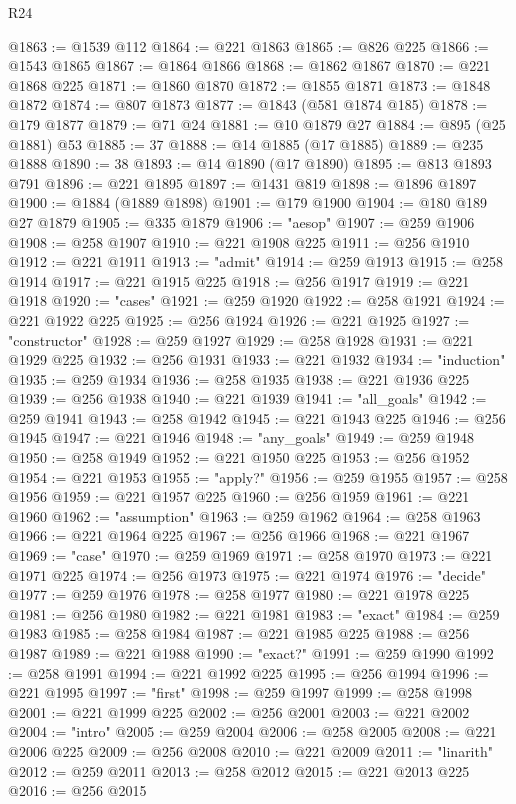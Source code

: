 \begin{lexlean}{R24}
\begin{coremodule}
@1863 := @1539 @112
@1864 := @221 @1863
@1865 := @826 @225
@1866 := @1543 @1865
@1867 := @1864 @1866
@1868 := @1862 @1867
@1870 := @221 @1868 @225
@1871 := @1860 @1870
@1872 := @1855 @1871
@1873 := @1848 @1872
@1874 := @807 @1873
@1877 := @1843 (@581 @1874 @185)
@1878 := @179 @1877
@1879 := @71 @24
@1881 := @10 @1879 @27
@1884 := @895 (@25 @1881) @53
@1885 := 37
@1888 := @14 @1885 (@17 @1885)
@1889 := @235 @1888
@1890 := 38
@1893 := @14 @1890 (@17 @1890)
@1895 := @813 @1893 @791
@1896 := @221 @1895
@1897 := @1431 @819
@1898 := @1896 @1897
@1900 := @1884 (@1889 @1898)
@1901 := @179 @1900
@1904 := @180 @189 @27 @1879
@1905 := @335 @1879
@1906 := "aesop"
@1907 := @259 @1906
@1908 := @258 @1907
@1910 := @221 @1908 @225
@1911 := @256 @1910
@1912 := @221 @1911
@1913 := "admit"
@1914 := @259 @1913
@1915 := @258 @1914
@1917 := @221 @1915 @225
@1918 := @256 @1917
@1919 := @221 @1918
@1920 := "cases"
@1921 := @259 @1920
@1922 := @258 @1921
@1924 := @221 @1922 @225
@1925 := @256 @1924
@1926 := @221 @1925
@1927 := "constructor"
@1928 := @259 @1927
@1929 := @258 @1928
@1931 := @221 @1929 @225
@1932 := @256 @1931
@1933 := @221 @1932
@1934 := "induction"
@1935 := @259 @1934
@1936 := @258 @1935
@1938 := @221 @1936 @225
@1939 := @256 @1938
@1940 := @221 @1939
@1941 := "all_goals"
@1942 := @259 @1941
@1943 := @258 @1942
@1945 := @221 @1943 @225
@1946 := @256 @1945
@1947 := @221 @1946
@1948 := "any_goals"
@1949 := @259 @1948
@1950 := @258 @1949
@1952 := @221 @1950 @225
@1953 := @256 @1952
@1954 := @221 @1953
@1955 := "apply?"
@1956 := @259 @1955
@1957 := @258 @1956
@1959 := @221 @1957 @225
@1960 := @256 @1959
@1961 := @221 @1960
@1962 := "assumption"
@1963 := @259 @1962
@1964 := @258 @1963
@1966 := @221 @1964 @225
@1967 := @256 @1966
@1968 := @221 @1967
@1969 := "case"
@1970 := @259 @1969
@1971 := @258 @1970
@1973 := @221 @1971 @225
@1974 := @256 @1973
@1975 := @221 @1974
@1976 := "decide"
@1977 := @259 @1976
@1978 := @258 @1977
@1980 := @221 @1978 @225
@1981 := @256 @1980
@1982 := @221 @1981
@1983 := "exact"
@1984 := @259 @1983
@1985 := @258 @1984
@1987 := @221 @1985 @225
@1988 := @256 @1987
@1989 := @221 @1988
@1990 := "exact?"
@1991 := @259 @1990
@1992 := @258 @1991
@1994 := @221 @1992 @225
@1995 := @256 @1994
@1996 := @221 @1995
@1997 := "first"
@1998 := @259 @1997
@1999 := @258 @1998
@2001 := @221 @1999 @225
@2002 := @256 @2001
@2003 := @221 @2002
@2004 := "intro"
@2005 := @259 @2004
@2006 := @258 @2005
@2008 := @221 @2006 @225
@2009 := @256 @2008
@2010 := @221 @2009
@2011 := "linarith"
@2012 := @259 @2011
@2013 := @258 @2012
@2015 := @221 @2013 @225
@2016 := @256 @2015

\end{coremodule}
\end{lexlean}
